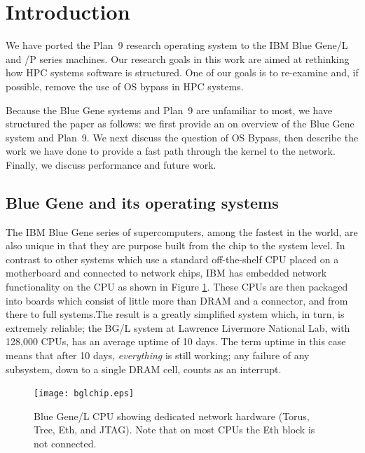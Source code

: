 \documentclass[letterpaper,twocolumn,10pt]{article}
\begin{document}
\section{Introduction}
We have ported the Plan~9 research operating system to the IBM Blue Gene/L and /P series machines. 
Our research goals in this work are aimed at rethinking how HPC systems software is structured. 
One of our goals is to  re-examine and, if possible, 
remove the use of OS bypass in HPC systems. 

Because the Blue Gene systems and Plan~9 are unfamiliar to most, we have structured the paper as follows: we first provide an on overview of the Blue Gene system and Plan~9. We next discuss the question of OS Bypass, then describe the work we have done to provide a fast path through the kernel to the network. Finally, we discuss performance and future work. 

\subsection{Blue Gene and its operating systems}
The IBM Blue Gene\cite{DBLP:journals/ibmrd/GaraBCCCGHHHKLOSTV05} series of supercomputers, among the fastest in the world, are also unique in that they are purpose built from the chip to the system level. In contrast to other systems which use a standard off-the-shelf CPU placed on a motherboard and connected to network chips, IBM has embedded network functionality on the CPU as shown in Figure \ref{bglchip}. These CPUs are then packaged into boards which consist of little more than DRAM and a connector, and from there to full systems.The result is a greatly simplified system which, in turn, is extremely reliable; the BG/L system at Lawrence Livermore National Lab, with 128,000 CPUs, has an average uptime of 10 days. The term uptime in this case means that after 10 days, {\em everything} is still working; any failure of any subsystem, down to a single DRAM cell, counts as an interrupt.
\begin{figure}
\texttt{[image: bglchip.eps]} 
\caption{\label{bglchip}Blue Gene/L CPU showing dedicated network hardware (Torus, Tree, Eth, and JTAG). Note that on most CPUs the Eth block is not connected.}
\end{figure}
\end{document}
